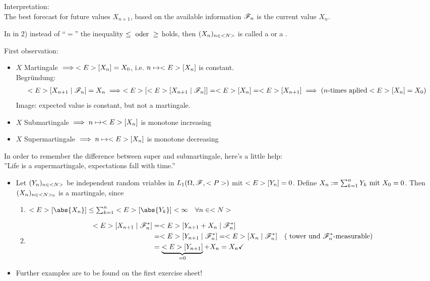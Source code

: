 Interpretation:\\
The best forecast for future values $X_{n+1}$, based on the available information $\F_n$ is the current value $X_n$.
\begin{*definition}
	In in 2) instead of ``$=$'' the inequality $\le \oder \ge$ holds, then $(X_n)_{n \in \N}$ is called a  or a .
\end{*definition}
First observation:\\
\begin{itemize}
	\item $X$ Martingale $\implies \E[X_n] = X_0$, i.e. $n \mapsto \E[X_n]$ is constant.\\
	Begründung:
	\begin{align*}
		\E[X_{n+1} \mid \F_n] = X_n \implies \E[\E[X_{n+1}\mid \F_n]] = \E[X_n] = \E[X_{n+1}] \implies (n\text{-times aplied} \E[X_n] = X_0)
	\end{align*}
	Image: expected value is constant, but not a martingale.
	\item $X$ Submartingale $\implies n \mapsto \E[X_n]$ is monotone increasing
	\item $X$ Supermartingale $\implies n \mapsto \E[X_n]$ is monotone decreasing
\end{itemize}
In order to remember the difference between super and submartingale, here's a little help: \\
''Life is a supermartingale, expectations fall with time.''
\begin{*example}
	\begin{itemize}
		\item Let $(Y_n)_{n\in \N}$ be independent random vriables in $L_1(\O,\F,\P)$ mit $\E[Y_n] = 0$. Define $X_n := \sum_{k=1}^n Y_k \mit X_0 = 0$. Then $(X_n)_{n \in \N_0}$ is a martingale, since
		\begin{enumerate}
			\item $\E[\abs{X_n}] \le \sum_{k=1}^n \E[\abs{Y_k}] < \infty \quad \forall n \in \N$ \checkmark
			\item
			\begin{align*}
				\E[X_{n+1} \mid \F_n^{\ast}] &= \E[Y_{n+1} + X_n \mid \F_n^{\ast}]\\
				&= \E[Y_{n+1} \mid \F_n^{\ast}] = \E[X_n \mid \F_n^{\ast}] \quad (\text{ tower und $\F_n^{\ast}$-measurable})\\
				&= \underbrace{\E[Y_{n+1}]}_{=0} + X_n = X_n \checkmark
			\end{align*}
		\end{enumerate}
		\item Further examples are to be found on the first exercise sheet!
	\end{itemize}
\end{*example}
